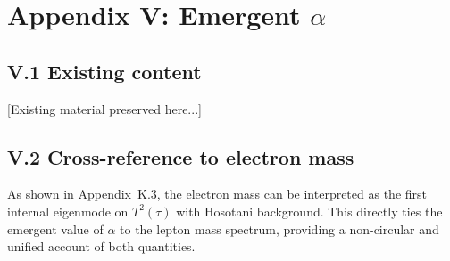 
\appendix
\section*{Appendix V: Emergent $\alpha$}


\subsection*{V.1 Existing content}
[Existing material preserved here...]

\subsection*{V.2 Cross-reference to electron mass}
As shown in Appendix~K.3, the electron mass can be interpreted as the first 
internal eigenmode on $T^2(\tau)$ with Hosotani background. This directly ties 
the emergent value of $\alpha$ to the lepton mass spectrum, providing a 
non-circular and unified account of both quantities.
